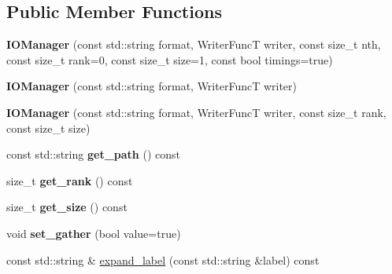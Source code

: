 \subsection*{Public Member Functions}
\begin{DoxyCompactItemize}
\item 
\mbox{\label{classwash_1_1io_1_1IOManager_acea5f3f8a7f3e8eb1bfda9bc551b8435}} 
{\bfseries I\+O\+Manager} (const std\+::string format, Writer\+FuncT writer, const size\+\_\+t nth, const size\+\_\+t rank=0, const size\+\_\+t size=1, const bool timings=true)
\item 
\mbox{\label{classwash_1_1io_1_1IOManager_a736c595ca08833f2a4df8f0db90ceb28}} 
{\bfseries I\+O\+Manager} (const std\+::string format, Writer\+FuncT writer)
\item 
\mbox{\label{classwash_1_1io_1_1IOManager_af011701d8fed420a51bafe7fcf035774}} 
{\bfseries I\+O\+Manager} (const std\+::string format, Writer\+FuncT writer, const size\+\_\+t rank, const size\+\_\+t size)
\item 
\mbox{\label{classwash_1_1io_1_1IOManager_aded7d1dbc7a4c2fc21e3a914ea0ea3b0}} 
const std\+::string {\bfseries get\+\_\+path} () const
\item 
\mbox{\label{classwash_1_1io_1_1IOManager_ad290bc39e3c9ccafb070bf6ba75597b6}} 
size\+\_\+t {\bfseries get\+\_\+rank} () const
\item 
\mbox{\label{classwash_1_1io_1_1IOManager_a01f3e40f12375f3128ad9b19f3ecda12}} 
size\+\_\+t {\bfseries get\+\_\+size} () const
\item 
\mbox{\label{classwash_1_1io_1_1IOManager_ab599141d728a1d6c09ce273a9e556eff}} 
void {\bfseries set\+\_\+gather} (bool value=true)
\item 
\mbox{\label{classwash_1_1io_1_1IOManager_ac0942e50fcd001ef853c8eb6b107e92d}} 
const std\+::string \& \mbox{\hyperlink{classwash_1_1io_1_1IOManager_ac0942e50fcd001ef853c8eb6b107e92d}{expand\+\_\+label}} (const std\+::string \&label) const

\end{DoxyCompactItemize}
